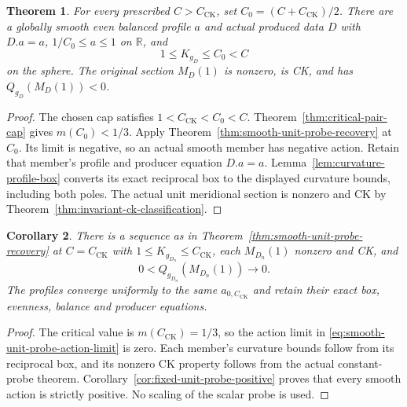 \documentclass[11pt]{article}
\newtheorem{theorem}{Theorem}[section]
\newtheorem{corollary}[theorem]{Corollary}
\newcommand{\R}{\mathbb R}
\begin{document}
\begin{theorem}\label{thm:smooth-supercritical-ck-witness}
For every prescribed $C>C_{\mathrm{CK}}$, set
$C_0=(C+C_{\mathrm{CK}})/2$. There are a globally smooth even balanced
profile $a$ and actual produced data $D$ with $D.a=a$,
$1/C_0\leq a\leq1$ on $\R$, and
\[
 1\leq K_{g_D}\leq C_0<C
\]
on the sphere. The original section $M_D(1)$ is nonzero, is CK, and has
$Q_{g_D}(M_D(1))<0$.
\end{theorem}

\begin{proof}
The chosen cap satisfies $1<C_{\mathrm{CK}}<C_0<C$.
Theorem~\ref{thm:critical-pair-cap} gives $m(C_0)<1/3$.
Apply Theorem~\ref{thm:smooth-unit-probe-recovery} at $C_0$.
Its limit is negative, so an actual smooth member has negative action.
Retain that member's profile and producer equation $D.a=a$.
Lemma~\ref{lem:curvature-profile-box} converts its exact reciprocal box
to the displayed curvature bounds, including both poles.
The actual unit meridional section is nonzero and CK by
Theorem~\ref{thm:invariant-ck-classification}.
\end{proof}

\begin{corollary}\label{cor:critical-fixed-probe-recovery}
There is a sequence as in Theorem~\ref{thm:smooth-unit-probe-recovery} at
$C=C_{\mathrm{CK}}$ with $1\leq K_{g_{D_n}}\leq C_{\mathrm{CK}}$,
each $M_{D_n}(1)$ nonzero and CK, and
\[
 0<Q_{g_{D_n}}(M_{D_n}(1))\longrightarrow0.
\]
The profiles converge uniformly to the same $a_{0,C_{\mathrm{CK}}}$ and
retain their exact box, evenness, balance and producer equations.
\end{corollary}

\begin{proof}
The critical value is $m(C_{\mathrm{CK}})=1/3$, so the action limit in
\eqref{eq:smooth-unit-probe-action-limit} is zero.
Each member's curvature bounds follow from its reciprocal box, and its
nonzero CK property follows from the actual constant-probe theorem.
Corollary~\ref{cor:fixed-unit-probe-positive} proves that every smooth
action is strictly positive. No scaling of the scalar probe is used.
\end{proof}
\end{document}
